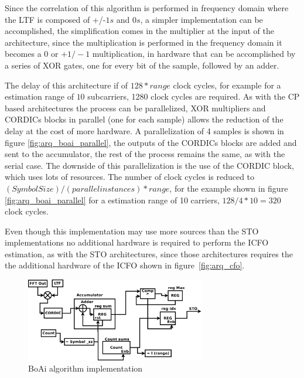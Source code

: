 
Since the correlation of this algorithm is performed in frequency domain where the LTF is composed of +/-$1s$ and $0s$, a simpler implementation can be accomplished, the simplification comes in the multiplier at the input of the architecture, since the multiplication is performed in the frequency domain it becomes a 0 or $+1/-1$ multiplication, in hardware that can be accomplished by a series of XOR gates, one for every bit of the sample, followed by an adder. 


The delay of this architecture if of $128*range$ clock cycles, for example for a estimation range of $10$ subcarriers, 1280 clock cycles are required. As with the CP based architectures the process can be parallelized, XOR multipliers and CORDICs blocks in parallel (one for each sample) allows the reduction of the delay at the cost of more hardware. A parallelization of 4 samples is shown in figure \ref{fig:arq_boai_parallel}, the outputs of the CORDICs blocks are added and sent to the accumulator, the rest of the process remains the same, as with the serial case. The downside of this parallelization is the use of the CORDIC block, which uses lots of resources. The number of clock cycles is reduced to $(Symbol Size)/(parallel instances)*range$, for the example shown in figure \ref{fig:arq_boai_parallel} for a estimation range of 10 carriers,  $128/4*10 = 320$ clock cycles.  

Even though this implementation may use more sources than the STO implementations no additional hardware is required to perform the ICFO estimation, as with the STO architectures, since those architectures requires the the additional hardware of the ICFO shown in figure~\ref{fig:arq_cfo}.


\begin{figure}[!hbt]
  \centering
    \includegraphics[width=0.7\textwidth]
      {./figures/boai_serial}
  \caption{BoAi algorithm implementation}
  \label{fig:arq_boai}
\end{figure}


